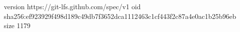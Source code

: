 version https://git-lfs.github.com/spec/v1
oid sha256:ef923929f498d189c49db7f3652dca1112463c1cf443f2c87a4e0ac1b25b96eb
size 1179
